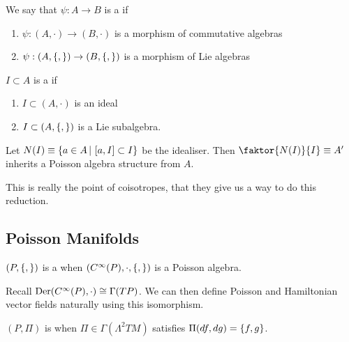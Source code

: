 \documentclass{article}
\begin{document}
\begin{definition}
We say that $\psi : A \to B$ is a  if 
\begin{enumerate}
    \item $\psi : (A, \cdot) \to (B, \cdot)$ is a morphism of commutative algebras
    \item $\psi : (A, \acomm[]{}) \to (B, \acomm[]{})$ is a morphism of Lie algebras
\end{enumerate}
\end{definition}

\begin{definition}
$I \subset A$ is a  if 
\begin{enumerate}
    \item $I \subset (A, \cdot)$ is an ideal
    \item $I \subset (A, \acomm[]{})$ is a Lie subalgebra. 
\end{enumerate}
\end{definition}

\begin{prop}
Let $N(I)\equiv \pbrace{a \in A \, | \, \comm[a]{I} \subset I}$ be the idealiser. Then $\faktor{N(I)}{I} \equiv A^\prime$ inherits a Poisson algebra structure from $A$.  
\end{prop}

\begin{idea}
This is really the point of coisotropes, that they give us a way to do this reduction. 
\end{idea}


\subsection{Poisson Manifolds}

\begin{definition}
$(P,\acomm[]{})$ is a  when $(C^\infty(P), \cdot, \acomm[]{})$ is a Poisson algebra. 
\end{definition}

Recall $\Der(C^\infty(P), \cdot) \cong \Gamma(TP)$. We can then define Poisson and Hamiltonian vector fields naturally using this isomorphism. 

\begin{definition}
$(P,\Pi)$ is  when $\Pi \in \Gamma(\Lambda^2 TM)$ satisfies $\Pi(df, dg) = \acomm[f]{g}$. 
\end{definition}
\end{document}
